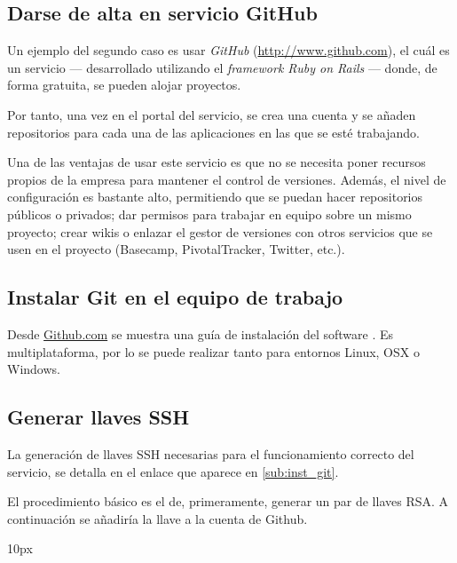 %
%
\subsection{Darse de alta en servicio GitHub}

Un ejemplo del segundo caso es usar {\it GitHub} (\url{http://www.github.com}), el cuál es un servicio --- desarrollado utilizando el {\it framework Ruby on Rails} --- donde, de forma gratuita, se pueden alojar proyectos. 

Por tanto, una vez en el portal del servicio, se crea una cuenta y se añaden repositorios para cada una de las aplicaciones en las que se esté trabajando.

Una de las ventajas de usar este servicio es que no se necesita poner recursos propios de la empresa para mantener el control de versiones. Además, el nivel de configuración es bastante alto, permitiendo que se puedan hacer repositorios públicos o privados; dar permisos para trabajar en equipo sobre un mismo proyecto; crear wikis o enlazar el gestor de versiones con otros servicios que se usen en el proyecto (Basecamp, PivotalTracker, Twitter, etc.).

%
%
\subsection{Instalar Git en el equipo de trabajo \label{sub:inst_git}}

Desde \url{Github.com} se muestra una guía de instalación del software \cite{guia_inst_git}. Es multiplataforma, por lo se puede realizar tanto para entornos Linux, OSX o Windows.

%
%
\subsection{Generar llaves SSH}

La generación de llaves SSH necesarias para el funcionamiento correcto del servicio, se detalla en el enlace que aparece en \ref{sub:inst_git}.

El procedimiento básico es el de, primeramente, generar un par de llaves RSA. A continuación se añadiría la llave a la cuenta de Github.

\begin{center}{
	\fboxsep 10px
	}
\end{center}


